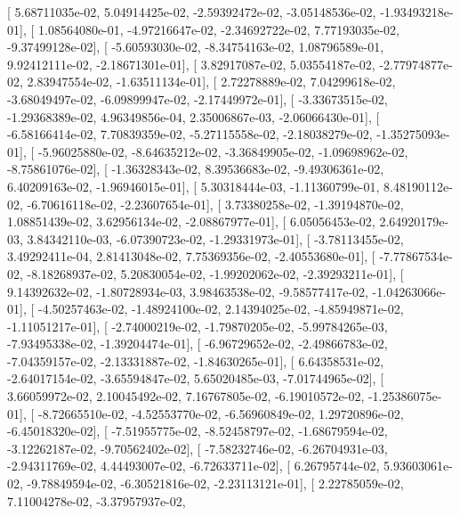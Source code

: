 \documentclass{article}
\begin{document}
       [  5.68711035e-02,   5.04914425e-02,  -2.59392472e-02,
         -3.05148536e-02,  -1.93493218e-01],
       [  1.08564080e-01,  -4.97216647e-02,  -2.34692722e-02,
          7.77193035e-02,  -9.37499128e-02],
       [ -5.60593030e-02,  -8.34754163e-02,   1.08796589e-01,
          9.92412111e-02,  -2.18671301e-01],
       [  3.82917087e-02,   5.03554187e-02,  -2.77974877e-02,
          2.83947554e-02,  -1.63511134e-01],
       [  2.72278889e-02,   7.04299618e-02,  -3.68049497e-02,
         -6.09899947e-02,  -2.17449972e-01],
       [ -3.33673515e-02,  -1.29368389e-02,   4.96349856e-04,
          2.35006867e-03,  -2.06066430e-01],
       [ -6.58166414e-02,   7.70839359e-02,  -5.27115558e-02,
         -2.18038279e-02,  -1.35275093e-01],
       [ -5.96025880e-02,  -8.64635212e-02,  -3.36849905e-02,
         -1.09698962e-02,  -8.75861076e-02],
       [ -1.36328343e-02,   8.39536683e-02,  -9.49306361e-02,
          6.40209163e-02,  -1.96946015e-01],
       [  5.30318444e-03,  -1.11360799e-01,   8.48190112e-02,
         -6.70616118e-02,  -2.23607654e-01],
       [  3.73380258e-02,  -1.39194870e-02,   1.08851439e-02,
          3.62956134e-02,  -2.08867977e-01],
       [  6.05056453e-02,   2.64920179e-03,   3.84342110e-03,
         -6.07390723e-02,  -1.29331973e-01],
       [ -3.78113455e-02,   3.49292411e-04,   2.81413048e-02,
          7.75369356e-02,  -2.40553680e-01],
       [ -7.77867534e-02,  -8.18268937e-02,   5.20830054e-02,
         -1.99202062e-02,  -2.39293211e-01],
       [  9.14392632e-02,  -1.80728934e-03,   3.98463538e-02,
         -9.58577417e-02,  -1.04263066e-01],
       [ -4.50257463e-02,  -1.48924100e-02,   2.14394025e-02,
         -4.85949871e-02,  -1.11051217e-01],
       [ -2.74000219e-02,  -1.79870205e-02,  -5.99784265e-03,
         -7.93495338e-02,  -1.39204474e-01],
       [ -6.96729652e-02,  -2.49866783e-02,  -7.04359157e-02,
         -2.13331887e-02,  -1.84630265e-01],
       [  6.64358531e-02,  -2.64017154e-02,  -3.65594847e-02,
          5.65020485e-03,  -7.01744965e-02],
       [  3.66059972e-02,   2.10045492e-02,   7.16767805e-02,
         -6.19010572e-02,  -1.25386075e-01],
       [ -8.72665510e-02,  -4.52553770e-02,  -6.56960849e-02,
          1.29720896e-02,  -6.45018320e-02],
       [ -7.51955775e-02,  -8.52458797e-02,  -1.68679594e-02,
         -3.12262187e-02,  -9.70562402e-02],
       [ -7.58232746e-02,  -6.26704931e-03,  -2.94311769e-02,
          4.44493007e-02,  -6.72633711e-02],
       [  6.26795744e-02,   5.93603061e-02,  -9.78849594e-02,
         -6.30521816e-02,  -2.23113121e-01],
       [  2.22785059e-02,   7.11004278e-02,  -3.37957937e-02,
\end{document}
